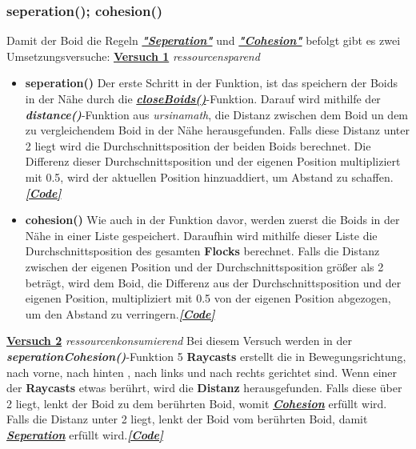 \documentclass[a4paper, hidelinks, 12pt]{article}
\begin{document}
\subsubsection{seperation(); cohesion()}
Damit der Boid die Regeln \hyperref[sec:Seperation]{\textbf{\emph{"Seperation"}}} und \hyperref[sec:Cohesion]{\textbf{\emph{"Cohesion"}}} befolgt gibt es zwei Umsetzungsversuche:\newline\newline
\underline{\textbf{Versuch 1}} \emph{ressourcensparend}
\begin{itemize}
	\item \textbf{seperation()}\label{sec:seperation}\newline
	Der erste Schritt in der Funktion, ist das speichern der Boids in der Nähe durch die \hyperref[sec:closeBoids]{\textbf{\emph{closeBoids()}}}-Funktion. Darauf wird mithilfe der \textbf{\emph{distance()}}-Funktion aus \emph{ursinamath}, die Distanz\cite{distance} zwischen dem Boid un dem zu vergleichendem Boid in der Nähe herausgefunden. Falls diese Distanz unter 2 liegt wird die Durchschnittsposition der beiden Boids berechnet. Die Differenz dieser Durchschnittsposition und der eigenen Position multipliziert mit 0.5, wird der aktuellen Position hinzuaddiert, um Abstand zu schaffen.\hyperref[Codeseperation]{\textbf{\emph{[Code]}}}
	\item \textbf{cohesion()}\label{sec:cohesion}\newline
	Wie auch in der Funktion davor, werden zuerst die Boids in der Nähe in einer Liste gespeichert. Daraufhin wird mithilfe dieser Liste die Durchschnittsposition des gesamten \textbf{Flocks} berechnet. Falls die Distanz\cite{distance} zwischen der eigenen Position und der Durchschnittsposition größer als 2 beträgt, wird dem Boid, die Differenz aus der Durchschnittsposition und der eigenen Position, multipliziert mit 0.5 von der eigenen Position abgezogen, um den Abstand zu verringern.\hyperref[Codecohesion]{\textbf{\emph{[Code]}}}
\end{itemize}
\newpage
\underline{\textbf{Versuch 2}} \emph{ressourcenkonsumierend}\label{sec:seperationCohesion}\newline
Bei diesem Versuch werden in der \textbf{\emph{seperationCohesion()}}-Funktion 5 \textbf{Raycasts} erstellt die in Bewegungsrichtung, nach vorne, nach hinten , nach links und nach rechts gerichtet sind. Wenn einer der \textbf{Raycasts}\cite{raycast} etwas berührt, wird die \textbf{Distanz}\cite{HitInfo} herausgefunden. Falls diese über 2 liegt, lenkt der Boid zu dem berührten Boid, womit \hyperref[sec:Cohesion]{\textbf{\emph{Cohesion}}} erfüllt wird. Falls die Distanz unter 2 liegt, lenkt der Boid vom berührten Boid, damit \hyperref[sec:Seperation]{\textbf{\emph{Seperation}}} erfüllt wird.\hyperref[CodeseperationCohesion]{\textbf{\emph{[Code]}}}
\end{document}
